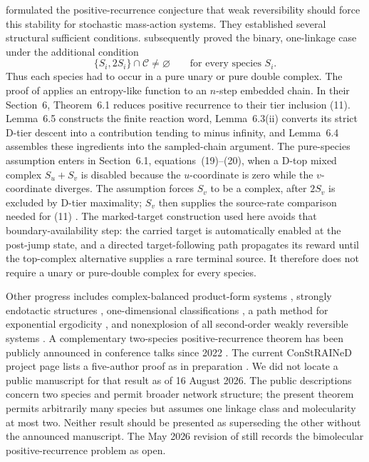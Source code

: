 \citet{AndersonKim2018} formulated the positive-recurrence conjecture that
weak reversibility should force this stability for stochastic mass-action
systems.  They established several structural sufficient conditions.
\citet{AndersonCappellettiKim2020} subsequently proved the binary,
one-linkage case under the additional condition
\begin{equation}\label{eq:ACK-condition}
  \{S_i,2S_i\}\cap\mathcal C\ne\varnothing
  \qquad\text{for every species }S_i.
\end{equation}
Thus each species had to occur in a pure unary or pure double complex.  The
proof of \citet{AndersonCappellettiKim2020} applies an entropy-like
function to an \(n\)-step embedded chain.  In their Section~6, Theorem~6.1
reduces positive recurrence to their tier inclusion (11).  Lemma~6.5
constructs the finite reaction word, Lemma~6.3(ii) converts its strict D-tier
descent into a contribution tending to minus infinity, and Lemma~6.4 assembles
these ingredients into the sampled-chain argument.  The pure-species
assumption enters in Section~6.1, equations~(19)--(20), when a D-top mixed
complex \(S_u+S_v\) is disabled because the \(u\)-coordinate is zero while
the \(v\)-coordinate diverges.  The assumption forces \(S_v\) to be a complex,
after \(2S_v\) is excluded by D-tier maximality; \(S_v\) then supplies the
source-rate comparison needed for (11)
\citep[Section~6; Theorem~6.1; Lemmas~6.3--6.5; Section~6.1;
equations~(19)--(20)]{AndersonCappellettiKim2020}.  The marked-target
construction used here avoids that boundary-availability step: the carried
target is automatically enabled at the post-jump state, and a directed
target-following path propagates its reward until the top-complex alternative
supplies a rare terminal source.  It therefore does not require a unary or
pure-double complex for every species.

Other progress includes complex-balanced product-form systems
\citep{AndersonCraciunKurtz2010}, strongly endotactic structures
\citep{AndersonCappellettiKimNguyen2020}, one-dimensional classifications
\citep{WiufXu2023}, a path method for exponential ergodicity
\citep{AndersonCappellettiFanKim2025}, and nonexplosion of all second-order
weakly reversible systems \citep{Xu2026}.  A complementary two-species
positive-recurrence theorem has been publicly announced in conference talks
since 2022 \citep{Agazzi2022Talk,Agazzi2025Talk}.  The current ConStRAINeD
project page lists a five-author proof as in preparation
\citep{ConStRAINeDResults}.  We did not locate a public manuscript for that
result as of 16 August 2026.  The public descriptions concern two species and
permit broader network structure; the present theorem permits arbitrarily many
species but assumes one linkage class and molecularity at most two.  Neither
result should be presented as superseding the other without the announced
manuscript.  The May 2026
revision of \citet{Xu2026} still records the bimolecular positive-recurrence
problem as open.

